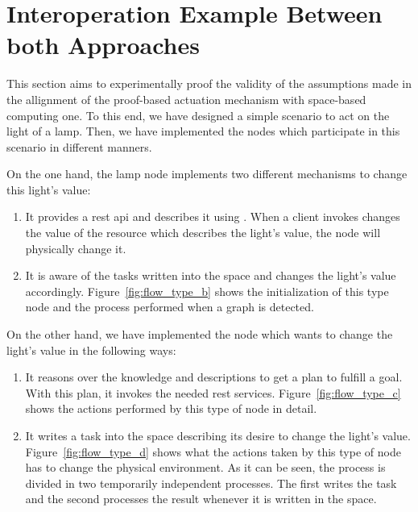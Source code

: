 \section{Interoperation Example Between both Approaches}

This section aims to experimentally proof the validity of the assumptions made in the allignment of the proof-based actuation mechanism with space-based computing one.
To this end, we have designed a simple scenario to act on the light of a lamp.
Then, we have implemented the nodes which participate in this scenario in different manners.


On the one hand, the lamp node implements two different mechanisms to change this light's value:
\begin{enumerate}[label=\itshape(\alph*\upshape)]
  \item It provides a \ac{rest} \ac{api} and describes it using \restdesc{}. %
        When a client invokes changes the value of the resource which describes the light's value, the node will physically change it.
  \item It is aware of the tasks written into the space and changes the light's value accordingly. %
	Figure~\ref{fig:flow_type_b} shows the initialization of this type node and the process performed when a graph is detected.
\end{enumerate}


On the other hand, we have implemented the node which wants to change the light's value in the following ways:
\begin{enumerate}[resume,label=\itshape(\alph*\upshape)]
  \item It reasons over the knowledge and descriptions to get a plan to fulfill a goal.
	With this plan, it invokes the needed \ac{rest} services.
	Figure~\ref{fig:flow_type_c} shows the actions performed by this type of node in detail.
  \item It writes a task into the space describing its desire to change the light's value.
	Figure~\ref{fig:flow_type_d} shows what the actions taken by this type of node has to change the physical environment.
	As it can be seen, the process is divided in two temporarily independent processes.
	The first writes the task and the second processes the result whenever it is written in the space.
\end{enumerate}


\newcommand{\prova}{\emph{(a)} provider}
\newcommand{\provb}{\emph{(b)} provider}
\newcommand{\consc}{\emph{(c)} consumer}
\newcommand{\consd}{\emph{(d)} consumer}
\newcommand{\typea}{\emph{Type (a)} node}
\newcommand{\typeb}{\emph{Type (b)} node}
\newcommand{\typec}{\emph{Type (c)} node}
\newcommand{\typed}{\emph{Type (d)} node}


